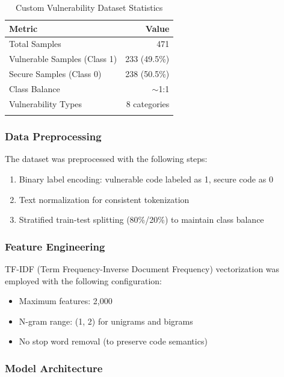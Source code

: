 \documentclass[pdflatex,sn-mathphys-num]{sn-jnl}
\theoremstyle{thmstyleone}%
\theoremstyle{thmstyletwo}%
\theoremstyle{thmstylethree}%
\begin{document}
\begin{table}[h]
\caption{Custom Vulnerability Dataset Statistics}\label{tab:dataset}
\begin{tabular}{lr}
\toprule
\textbf{Metric} & \textbf{Value} \\ 
\midrule
Total Samples & 471 \\
Vulnerable Samples (Class 1) & 233 (49.5\%) \\
Secure Samples (Class 0) & 238 (50.5\%) \\
Class Balance & $\sim$1:1 \\
Vulnerability Types & 8 categories \\
\botrule
\end{tabular}
\end{table}

\subsubsection{Data Preprocessing}\label{subsubsec:preprocessing}

The dataset was preprocessed with the following steps:

\begin{enumerate}
    \item Binary label encoding: vulnerable code labeled as 1, secure code as 0
    \item Text normalization for consistent tokenization
    \item Stratified train-test splitting (80\%/20\%) to maintain class balance
\end{enumerate}

\subsubsection{Feature Engineering}\label{subsubsec:features}

TF-IDF (Term Frequency-Inverse Document Frequency) vectorization was employed with the following configuration:

\begin{itemize}
    \item Maximum features: 2,000
    \item N-gram range: (1, 2) for unigrams and bigrams
    \item No stop word removal (to preserve code semantics)
\end{itemize}

\subsubsection{Model Architecture}\label{subsubsec:model}
\end{document}
